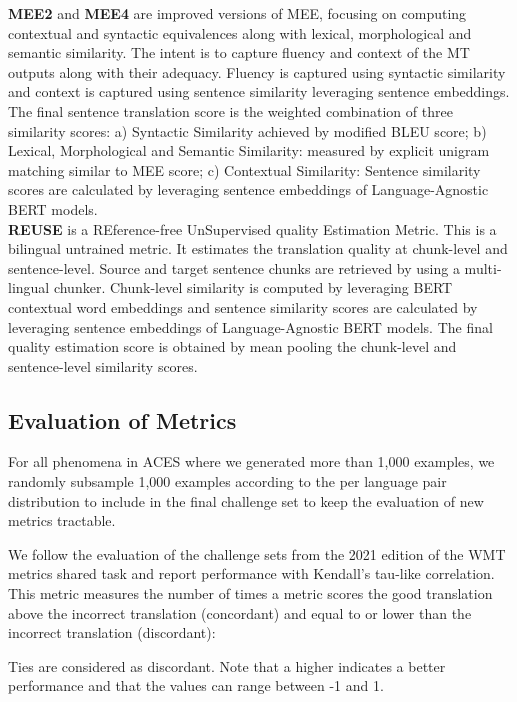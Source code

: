 \documentclass[11pt]{article}
\begin{document}
\noindent \textbf{MEE2} and \textbf{MEE4} \citep{MEE:WMT22} are improved versions of \textsc{MEE}, focusing on computing contextual and syntactic equivalences along with lexical, morphological and semantic similarity. The intent is to capture fluency and context of the MT outputs along with their adequacy. Fluency is captured using syntactic similarity and context is captured using sentence similarity leveraging sentence embeddings. The final sentence translation score is the weighted combination of three similarity scores: a) Syntactic Similarity achieved by modified BLEU score; b) Lexical, Morphological and Semantic Similarity: measured by explicit unigram matching similar to MEE score; c) Contextual Similarity: Sentence similarity scores are calculated by leveraging sentence embeddings of Language-Agnostic BERT models.\\

\noindent \textbf{REUSE} \citep{REUSE:WMT22} is a REference-free UnSupervised quality Estimation Metric. This is a bilingual untrained metric. It estimates the translation quality at chunk-level and sentence-level. Source and target sentence chunks are retrieved by using a multi-lingual chunker. Chunk-level similarity is computed by leveraging BERT contextual word embeddings and sentence similarity scores are calculated by leveraging sentence embeddings of Language-Agnostic BERT models. The final quality estimation score is obtained by mean pooling the chunk-level and sentence-level similarity scores.


\subsection{Evaluation of Metrics}

For all phenomena in \textsc{ACES} where we generated more than 1,000 examples, we randomly subsample 1,000 examples according to the per language pair distribution to include in the final challenge set to keep the evaluation of new metrics tractable.

We follow the evaluation of the challenge sets from the 2021 edition of the WMT metrics shared task \citep{freitag-etal-2021-results} and report performance with Kendall's tau-like correlation. This metric measures the number of times a metric scores the good translation above the incorrect translation (concordant) and equal to or lower than the incorrect translation (discordant):
\begin{center}

\end{center}
Ties are considered as discordant. Note that a higher  indicates a better performance and that the values can range between -1 and 1. 
\end{document}
